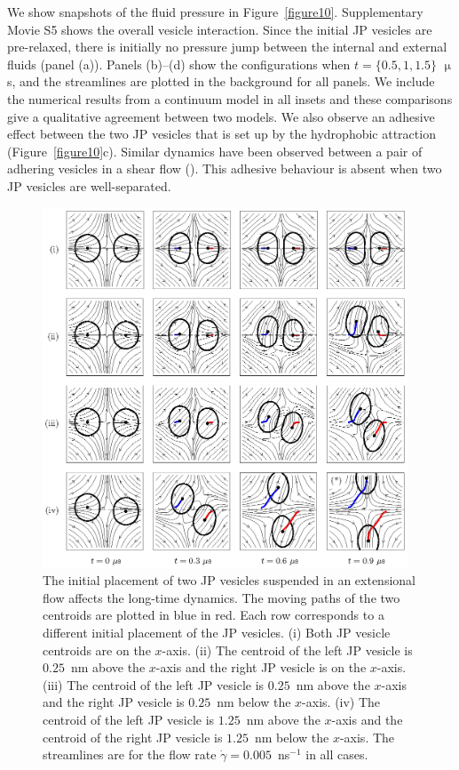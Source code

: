 \documentclass[lineno]{jfm}
\begin{document}
We show snapshots of the fluid pressure in Figure~\ref{figure10}. 
Supplementary Movie S5 shows the overall vesicle interaction.
Since the
initial JP vesicles are pre-relaxed, there is initially no pressure jump
between the internal and external fluids (panel (a)). Panels (b)--(d)
show the configurations when $t = \{0.5,1,1.5\}$ $\upmu$s, and the
streamlines are plotted in the background for all panels. 
We include the numerical results from a continuum model in all insets and these
comparisons give a qualitative agreement between two models.
We also observe an adhesive
effect between the two JP vesicles that is set up by the hydrophobic
attraction (Figure~\ref{figure10}c). Similar dynamics have been observed between a pair of adhering vesicles in a shear flow
(\cite{qua-vee-you2019, abb-far-ezz-ben-mis2021}). This adhesive
behaviour is absent when two JP vesicles are well-separated.

\begin{figure}
\begin{center}
\includegraphics[width=0.97\textwidth]{fig11.eps}
\end{center} 
  \caption{\label{figure11} The initial placement of two JP vesicles
  suspended in an extensional flow affects the long-time dynamics. The
  moving paths of the two centroids are plotted in blue in red. Each row
  corresponds to a different initial placement of the JP vesicles. (i)
  Both JP vesicle centroids are on the $x$-axis. (ii) The centroid of
  the left JP vesicle is $0.25$~nm above the $x$-axis and the right JP
  vesicle is on the $x$-axis. (iii) The centroid of the left JP vesicle
  is $0.25$~nm above the $x$-axis and the right JP vesicle is $0.25$~nm
  below the $x$-axis. (iv) The centroid of the left JP vesicle is
  $1.25$~nm above the $x$-axis and the centroid of the right JP vesicle
  is $1.25$~nm below the $x$-axis. The streamlines are for
  the flow rate $\dot \gamma =0.005$~ns$^{-1}$ in all cases.
	  }
\end{figure}
\end{document}
